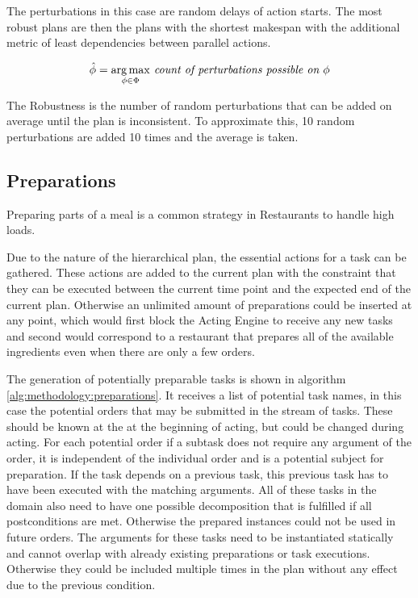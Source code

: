 
The perturbations in this case are random delays of action starts.
The most robust plans are then the plans with the shortest makespan with the additional metric of least dependencies between parallel actions.


\begin{align}
    \hat{\phi} = \underset{\phi \in \Phi}{\operatorname*{arg\,max}} \textit{ count of perturbations possible on } \phi
\end{align}


The Robustness is the number of random perturbations that can be added on average until the plan is inconsistent.
To approximate this, 10 random perturbations are added 10 times and the average is taken.


\subsection{Preparations}

Preparing parts of a meal is a common strategy in Restaurants to handle high loads.

Due to the nature of the hierarchical plan, the essential actions for a task can be gathered.
These actions are added to the current plan with the constraint that they can be executed between the current time point and the expected end of the current plan.
Otherwise an unlimited amount of preparations could be inserted at any point, which would first block the Acting Engine to receive any new tasks and second would correspond to a restaurant that prepares all of the available ingredients even when there are only a few orders.

The generation of potentially preparable tasks is shown in algorithm \ref{alg:methodology:preparations}.
It receives a list of potential task names, in this case the potential orders that may be submitted in the stream of tasks.
These should be known at the at the beginning of acting, but could be changed during acting.
For each potential order if a subtask does not require any argument of the order, it is independent of the individual order and is a potential subject for preparation.
If the task depends on a previous task, this previous task has to have been executed with the matching arguments.
All of these tasks in the domain also need to have one possible decomposition that is fulfilled if all postconditions are met.
Otherwise the prepared instances could not be used in future orders.
The arguments for these tasks need to be instantiated statically and cannot overlap with already existing preparations or task executions.
Otherwise they could be included multiple times in the plan without any effect due to the previous condition.


